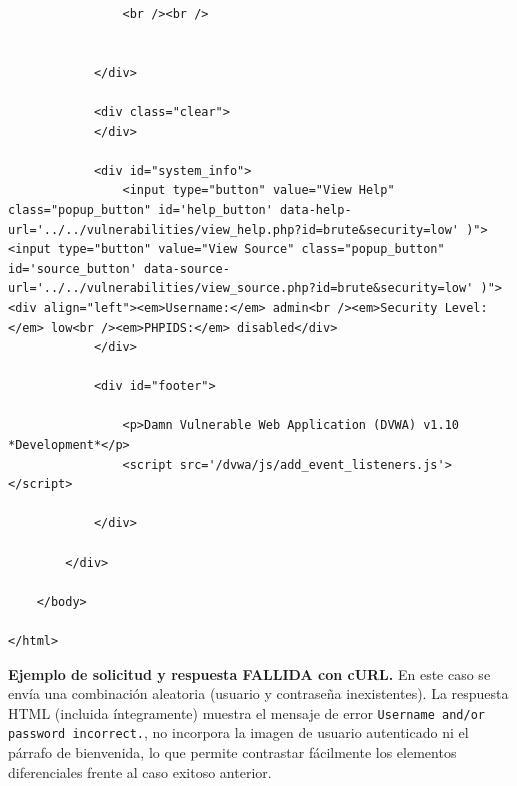\documentclass[letterpaper,12pt]{article}
\begin{document}
\begin{verbatim}
				<br /><br />
				

			</div>

			<div class="clear">
			</div>

			<div id="system_info">
				<input type="button" value="View Help" class="popup_button" id='help_button' data-help-url='../../vulnerabilities/view_help.php?id=brute&security=low' )"> <input type="button" value="View Source" class="popup_button" id='source_button' data-source-url='../../vulnerabilities/view_source.php?id=brute&security=low' )"> <div align="left"><em>Username:</em> admin<br /><em>Security Level:</em> low<br /><em>PHPIDS:</em> disabled</div>
			</div>

			<div id="footer">

				<p>Damn Vulnerable Web Application (DVWA) v1.10 *Development*</p>
				<script src='/dvwa/js/add_event_listeners.js'></script>

			</div>

		</div>

	</body>

</html>
\end{verbatim}
\noindent\textbf{Ejemplo de solicitud y respuesta FALLIDA con cURL.} En este caso se envía una combinación aleatoria (usuario y contraseña inexistentes). La respuesta HTML (incluida íntegramente) muestra el mensaje de error \texttt{Username and/or password incorrect.}, no incorpora la imagen de usuario autenticado ni el párrafo de bienvenida, lo que permite contrastar fácilmente los elementos diferenciales frente al caso exitoso anterior.
\end{document}
